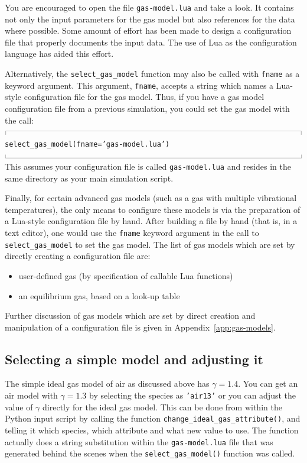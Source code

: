 \documentclass[12pt,a4paper,twoside]{article}
\newcommand{\topbar}{\ensuremath{
    \rule{0.1mm}{2.0mm} \rule[2.0mm]{159.5mm}{0.1mm} \rule{0.1mm}{2.0mm}
}}
\newcommand{\bottombar}{\ensuremath{
    \rule{0.1mm}{2.0mm} \rule{159.5mm}{0.1mm} \rule{0.1mm}{2.0mm}
}}
\begin{document}
\medskip
You are encouraged to open the file \texttt{gas-model.lua} and take a look.
It contains not only the input parameters for the gas model but also references for the
data where possible.
Some amount of effort has been made to design a configuration file that
properly documents the input data.
The use of Lua as the configuration language has aided this effort.

\medskip
Alternatively, the \texttt{select\_gas\_model} function may also be called
with \texttt{fname} as a keyword argument.
This argument, \texttt{fname}, accepts a string which names a Lua-style configuration
file for the gas model.
Thus, if you have a gas model configuration file from a previous simulation, you could
set the gas model with the call:\\
%
\topbar\\
\texttt{select\_gas\_model(fname='gas-model.lua')}\\
\bottombar\\
%
This assumes your configuration file is called \texttt{gas-model.lua} and resides
in the same directory as your main simulation script.

\medskip
Finally, for certain advanced gas models (such as a gas with multiple vibrational temperatures),
the only means to configure these models is via the preparation of a Lua-style configuration
file by hand.
After building a file by hand (that is, in a text editor), one would use the \texttt{fname} keyword
argument in the call to \texttt{select\_gas\_model} to set the gas model.
The list of gas models which are set by directly creating a configuration file are:
\begin{itemize}
 \item user-defined gas (by specification of callable Lua functions)
 \item an equilibrium gas, based on a look-up table
\end{itemize}
Further discussion of gas models which are set by direct creation
and manipulation of a configuration file is given in Appendix~\ref{app:gas-models}.

\subsection{Selecting a simple model and adjusting it}
The simple ideal gas model of air as discussed above has $\gamma = 1.4$.
You can get an air model with $\gamma = 1.3$ by selecting the species
as \texttt{'air13'} or you can adjust the value of $\gamma$ directly
for the ideal gas model.
This can be done from within the Python input script by calling the function 
\texttt{change\_ideal\_gas\_attribute()},
and telling it which species, which attribute and what new value to use.
The function actually does a string substitution within the \texttt{gas-model.lua} file
that was generated behind the scenes when the \texttt{select\_gas\_model()} function was called.
\end{document}
